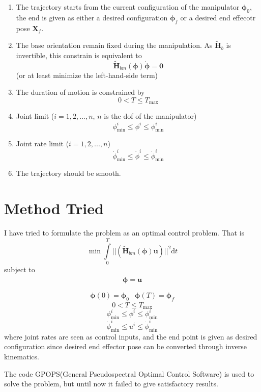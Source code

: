 \documentclass{article}
\begin{document}
\begin{enumerate}
	\item The trajectory starts from the current configuration of the manipulator $\bm{\phi}_0$, the end is given as either a desired configuration $\bm{\phi}_f$ or a desired end effecotr pose $\bm{X}_f$.
	\item The base orientation remain fixed during the manipulation. As $\tilde{\bm{H}}_b$ is invertible, this constrain is equivalent to 
	\begin{equation}
		\tilde{\bm{H}}_{bm}(\bm{\phi})\dot{\bm{\phi}} = \bm{0}
	\end{equation}
	(or at least minimize the left-hand-side term)
	\item The duration of motion is constrained by 
	\begin{equation}
		0 < T \le T_{\mathrm{max}}
	\end{equation}
	\item Joint limit ($i = 1,2,...,n$, $n$ is the dof of the manipulator)
	\begin{equation}
		\phi^i_{\mathrm{min}} \le \phi^i \le \phi^i_{\mathrm{min}}
	\end{equation}
	\item Joint rate limit ($i = 1,2,...,n$)
		\begin{equation}
		\dot{\phi}^i_{\mathrm{min}} \le \dot{\phi}^i \le \dot{\phi}^i_{\mathrm{min}}
		\end{equation}
	\item The trajectory should be smooth.
\end{enumerate}

\section{Method Tried}
I have tried to formulate the problem as an optimal control problem. That is 
	\begin{equation}
	\label{e:min}
		\min\int\limits_0^T||(\tilde{\bm{H}}_{bm}(\bm{\phi})\bm{u})||^2\mathrm{d}t
	\end{equation}
	subject to
	\begin{equation}
		\dot{\bm{\phi}} = \bm{u}
	\end{equation}
	
	\begin{equation}
	\begin{array}{rl}
		\bm{\phi}(0) = \bm{\phi}_0 & \bm{\phi}(T) = \bm{\phi}_f
	\end{array}	
	\end{equation}
	\begin{equation}
		0 < T \le T_{\mathrm{max}}
	\end{equation}
	\begin{equation}
		\phi^i_{\mathrm{min}} \le \phi^i \le \phi^i_{\mathrm{min}}
	\end{equation}
	\begin{equation}
		\dot{\phi}^i_{\mathrm{min}} \le {u}^i \le \dot{\phi}^i_{\mathrm{min}}
	\end{equation}
where joint rates are seen as control inputs, and the end point is given as desired configuration since desired end effector pose can be converted through inverse kinematics.

The code GPOPS(General Pseudospectral Optimal Control Software) is used to solve the problem, but until now it failed to give satisfactory results.



\end{document}
